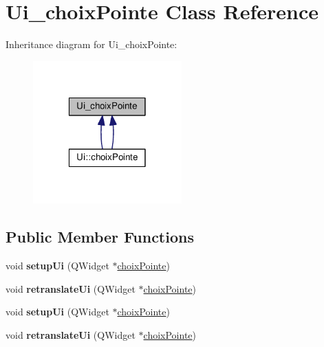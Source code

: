 \hypertarget{class_ui__choix_pointe}{\section{Ui\-\_\-choix\-Pointe Class Reference}
\label{class_ui__choix_pointe}
}


Inheritance diagram for Ui\-\_\-choix\-Pointe\-:
\nopagebreak
\begin{figure}[H]
\begin{center}
\leavevmode
\includegraphics[width=162pt]{class_ui__choix_pointe__inherit__graph}
\end{center}
\end{figure}
\subsection*{Public Member Functions}
\begin{DoxyCompactItemize}
\item 
\hypertarget{class_ui__choix_pointe_afb01f288ce6a40c26c0346d1e0024f4e}{void {\bfseries setup\-Ui} (Q\-Widget $\ast$\hyperlink{classchoix_pointe}{choix\-Pointe})}\label{class_ui__choix_pointe_afb01f288ce6a40c26c0346d1e0024f4e}

\item 
\hypertarget{class_ui__choix_pointe_aea42cc3aeeb1ea76b18aeac75a7ec2cc}{void {\bfseries retranslate\-Ui} (Q\-Widget $\ast$\hyperlink{classchoix_pointe}{choix\-Pointe})}\label{class_ui__choix_pointe_aea42cc3aeeb1ea76b18aeac75a7ec2cc}

\item 
\hypertarget{class_ui__choix_pointe_afb01f288ce6a40c26c0346d1e0024f4e}{void {\bfseries setup\-Ui} (Q\-Widget $\ast$\hyperlink{classchoix_pointe}{choix\-Pointe})}\label{class_ui__choix_pointe_afb01f288ce6a40c26c0346d1e0024f4e}

\item 
\hypertarget{class_ui__choix_pointe_aea42cc3aeeb1ea76b18aeac75a7ec2cc}{void {\bfseries retranslate\-Ui} (Q\-Widget $\ast$\hyperlink{classchoix_pointe}{choix\-Pointe})}\label{class_ui__choix_pointe_aea42cc3aeeb1ea76b18aeac75a7ec2cc}

\end{DoxyCompactItemize}
